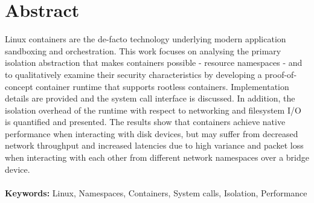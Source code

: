 \chapter*{Abstract}
Linux containers are the de-facto technology underlying 
modern application sandboxing and orchestration. This work focuses 
on analysing the primary isolation abstraction that makes 
containers possible - resource namespaces - and to qualitatively examine their security characteristics
by developing a proof-of-concept container runtime that supports rootless containers. 
Implementation details are provided and the system call interface is discussed.
In addition, the isolation overhead 
of the runtime with respect to networking and filesystem I/O is quantified and presented.
The results show that containers achieve native performance when interacting with 
disk devices, but may suffer from decreased network throughput and increased latencies due to high variance 
and packet loss when interacting with each other from different network namespaces over a bridge device.
\\
\\
\textbf{Keywords:} Linux, Namespaces, Containers, System calls, Isolation, Performance
